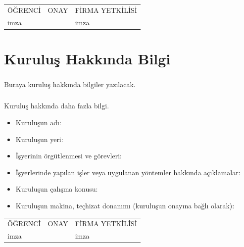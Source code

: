 \documentclass[12pt,a4paper]{report}
\begin{document}
  


\tableofcontents

\mbox{}
\vfill
\begin{center}
\begin{tabular}{|>{\centering}m{3.6cm}|>{\centering}m{7.4cm}|>{\centering}m{4cm}|}
ÖĞRENCİ&ONAY&FİRMA YETKİLİSİ
\tabularnewline
imza &&imza
\end{tabular}
\end{center}

\newpage %

\chapter*{Kuruluş Hakkında Bilgi}

\paragraph{} Buraya kuruluş hakkında bilgiler yazılacak.
\paragraph{} Kuruluş hakkında daha fazla bilgi.

\begin{itemize}
\item Kuruluşun adı:
\item Kuruluşun yeri:
\item İşyerinin örgütlenmesi ve görevleri:
\item İşyerlerinde yapılan işler veya uygulanan yöntemler hakkında açıklamalar:
\item Kuruluşun çalışma konusu:
\item Kuruluşun makina, teçhizat donanımı (kuruluşun onayına bağlı olarak):
\end{itemize}

\mbox{}
\vfill
\begin{center}
\begin{tabular}{|>{\centering}m{3.6cm}|>{\centering}m{7.4cm}|>{\centering}m{4cm}|}
ÖĞRENCİ&ONAY&FİRMA YETKİLİSİ
\tabularnewline
imza &&imza
\end{tabular}
\end{center}
\end{document}
